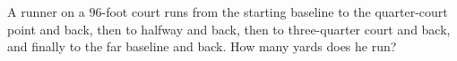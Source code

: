 A runner on a $96$-foot court runs from the starting baseline to the quarter-court point and back, then to halfway and back, then to three-quarter court and back, and finally to the far baseline and back. How many yards does he run?
